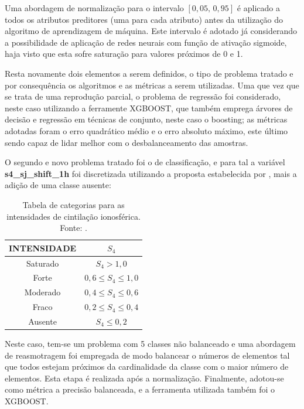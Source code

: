 Uma abordagem de normalização para o intervalo $[0,05,\,0,95]$ é aplicado a todos os atributos preditores (uma para cada atributo) antes da utilização do algoritmo de aprendizagem de máquina. Este intervalo é adotado já considerando a possibilidade de aplicação de redes neurais com função de ativação sigmoide, haja visto que esta sofre saturação para valores próximos de 0 e 1.

Resta novamente dois elementos a serem definidos, o tipo de problema tratado e por consequência os algoritmos e as métricas a serem utilizadas. Uma que vez que se trata de uma reprodução parcial, o problema de regressão foi considerado, neste caso utilizando a ferramente XGBOOST, que também emprega árvores de decisão e regressão em técnicas de conjunto, neste caso o boosting; as métricas adotadas foram o erro quadrático médio e o erro absoluto máximo, este último sendo capaz de lidar melhor com o desbalanceamento das amostras.

O segundo e novo problema tratado foi o de classificação, e para tal a variável {\bf s4\_sj\_shift\_1h} foi discretizada utilizando a proposta estabelecida por \cite{MUELLA:2008}, mais a adição de uma classe ausente:

\begin{table}[H]
\begin{center}
\begin{tabular}{|c|c|}
\hline
{\bf INTENSIDADE} & {\bf $S_4$} \\ \hline
Saturado          & $S_4 > 1,0$ \\ \hline
Forte             & $0,6 \le S_4 \le 1,0$ \\ \hline
Moderado          & $0,4 \le S_4 \le 0,6$ \\ \hline
Fraco             & $0,2 \le S_4 \le 0,4$ \\ \hline
Ausente           & $ S_4 \le 0,2 $ \\ \hline
\end{tabular}
\end{center}
\caption{Tabela de categorias para as intensidades de cintilação ionosférica. Fonte: \cite{MUELLA:2008}.}
\label{tab:class4}
\end{table}

Neste caso, tem-se um problema com 5 classes não balanceado e uma abordagem de reasmotragem foi empregada de modo balancear o números de elementos tal que todos estejam próximos da cardinalidade da classe com o maior número de elementos. Esta etapa é realizada após a normalização. Finalmente, adotou-se como métrica a precisão balanceada, e a ferramenta utilizada também foi o XGBOOST.

